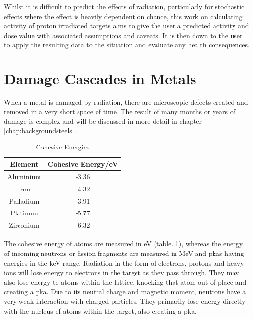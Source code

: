 Whilst it is difficult to predict the effects of radiation, particularly for stochastic effects where the effect is heavily dependent on chance, this work on calculating activity of proton irradiated targets aims to give the user a predicted activity and dose value with associated assumptions and caveats.  It is then down to the user to apply the resulting data to the situation and evaluate any health consequences.





\FloatBarrier

\section{Damage Cascades in Metals}

When a metal is damaged by radiation, there are microscopic defects created and removed in a very short space of time.  The result of many months or years of damage is complex and will be discussed in more detail in chapter \ref{chap:backgroundsteels}.

\begin{table}[h]
\begin{center}
\renewcommand{\arraystretch}{1.2}
\begin{tabular}{c c}
\hline\hline
Element & Cohesive Energy/eV \\
\hline\hline
Aluminium & -3.36 \\
Iron & -4.32 \\
Palladium & -3.91 \\
Platinum & -5.77 \\
Zirconium & -6.32 \\
\hline\hline
\end{tabular}
\end{center}
\caption{Cohesive Energies \cite{shengeamonline}}
\label{table:cohesiveexamples}
\end{table}

The cohesive energy of atoms are measured in eV (table. \ref{table:cohesiveexamples}), whereas the energy of incoming neutrons or fission fragments are measured in MeV and \acrshort{pka}s having energies in the keV range.  Radiation in the form of electrons, protons and heavy ions will lose energy to electrons in the target as they pass through.  They may also lose energy to atoms within the lattice, knocking that atom out of place and creating a \acrshort{pka}.  Due to its neutral charge and magnetic moment, neutrons have a very weak interaction with charged particles.  They primarily lose energy directly with the nucleus of atoms within the target, also creating a \acrshort{pka}.

